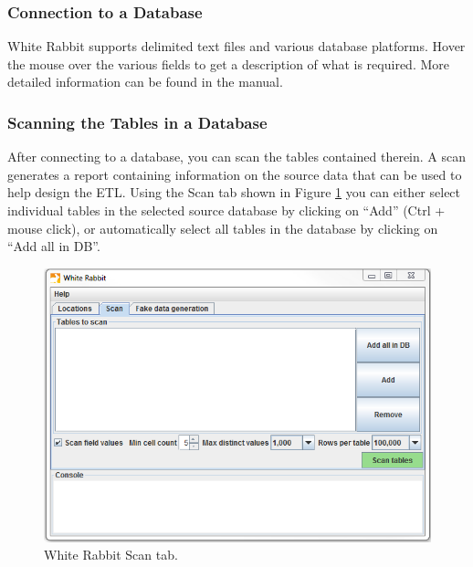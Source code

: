 \documentclass[11pt]{book}
\theoremstyle{definition}
\theoremstyle{definition}
\theoremstyle{definition}
\theoremstyle{remark}
\begin{document}
\hypertarget{connection-to-a-database}{%
\subsubsection*{Connection to a Database}\label{connection-to-a-database}}

White Rabbit supports delimited text files and various database platforms. Hover the mouse over the various fields to get a description of what is required. More detailed information can be found in the manual.

\hypertarget{scanning-the-tables-in-a-database}{%
\subsubsection*{Scanning the Tables in a Database}\label{scanning-the-tables-in-a-database}}

After connecting to a database, you can scan the tables contained therein. A scan generates a report containing information on the source data that can be used to help design the ETL. Using the Scan tab shown in Figure \ref{fig:WhiteRabbitAddTables} you can either select individual tables in the selected source database by clicking on ``Add'' (Ctrl + mouse click), or automatically select all tables in the database by clicking on ``Add all in DB''.

\begin{figure}
\includegraphics[width=1\linewidth]{images/ExtractTransformLoad/WhiteRabbitAddTables} \caption{White Rabbit Scan tab.}\label{fig:WhiteRabbitAddTables}
\end{figure}
\end{document}
